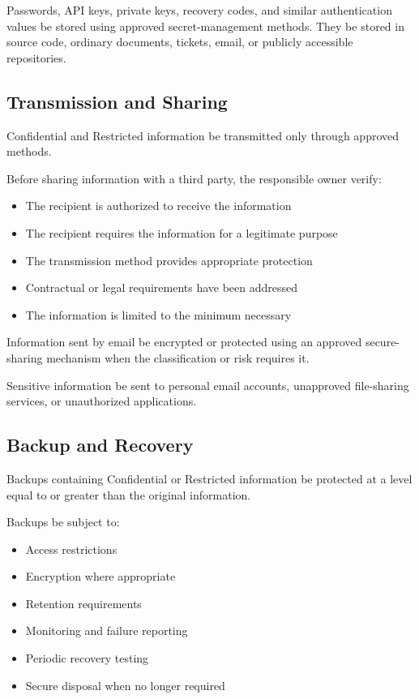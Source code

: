 Passwords, API keys, private keys, recovery codes, and similar authentication values \must{} be stored using approved secret-management methods. They \mustnot{} be stored in source code, ordinary documents, tickets, email, or publicly accessible repositories.

\subsection{Transmission and Sharing}

Confidential and Restricted information \must{} be transmitted only through approved methods.

Before sharing information with a third party, the responsible owner \must{} verify:
\begin{itemize}
    \item The recipient is authorized to receive the information
    \item The recipient requires the information for a legitimate purpose
    \item The transmission method provides appropriate protection
    \item Contractual or legal requirements have been addressed
    \item The information is limited to the minimum necessary
\end{itemize}

Information sent by email \should{} be encrypted or protected using an approved secure-sharing mechanism when the classification or risk requires it.

Sensitive information \mustnot{} be sent to personal email accounts, unapproved file-sharing services, or unauthorized applications.

\subsection{Backup and Recovery}

Backups containing Confidential or Restricted information \must{} be protected at a level equal to or greater than the original information.

Backups \must{} be subject to:
\begin{itemize}
    \item Access restrictions
    \item Encryption where appropriate
    \item Retention requirements
    \item Monitoring and failure reporting
    \item Periodic recovery testing
    \item Secure disposal when no longer required
\end{itemize}

